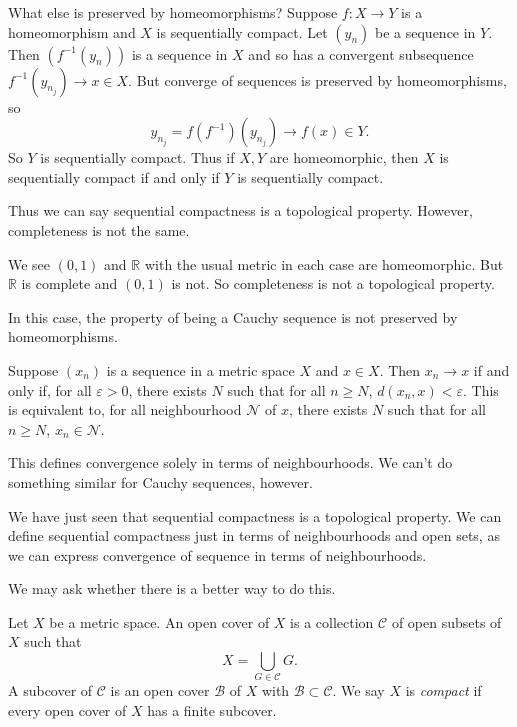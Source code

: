 \documentclass[12pt]{article}
\begin{document}
What else is preserved by homeomorphisms? Suppose $f : X \to Y$ is a homeomorphism and $X$ is sequentially compact. Let $(y_n)$ be a sequence in $Y$. Then $(f^{-1}(y_n))$ is a sequence in $X$ and so has a convergent subsequence $f^{-1}(y_{n_j}) \to x \in X$. But converge of sequences is preserved by homeomorphisms, so
\[
	y_{n_j} = f(f^{-1})(y_{n_j}) \to f(x) \in Y
.\]
So $Y$ is sequentially compact. Thus if $X, Y$ are homeomorphic, then $X$ is sequentially compact if and only if $Y$ is sequentially compact.

Thus we can say sequential compactness is a topological property. However, completeness is not the same.

\begin{exbox}
	We see $(0, 1)$ and $\mathbb{R}$ with the usual metric in each case are homeomorphic. But $\mathbb{R}$ is complete and $(0, 1)$ is not. So completeness is not a topological property.
\end{exbox}

In this case, the property of being a Cauchy sequence is not preserved by homeomorphisms.

\begin{remark}
	Suppose $(x_n)$ is a sequence in a metric space $X$ and $x \in X$. Then $x_n \to x$ if and only if, for all $\varepsilon > 0$, there exists $N$ such that for all $n \geq N$, $d(x_n, x) < \varepsilon$. This is equivalent to, for all neighbourhood $\mathcal{N}$ of $x$, there exists $N$ such that for all $n \geq N$, $x_n \in \mathcal{N}$.

	This defines convergence solely in terms of neighbourhoods. We can't do something similar for Cauchy sequences, however.
\end{remark}

We have just seen that sequential compactness is a topological property. We can define sequential compactness just in terms of neighbourhoods and open sets, as we can express convergence of sequence in terms of neighbourhoods.

We may ask whether there is a better way to do this.

\begin{definition}
	Let $X$ be a metric space. An open cover of $X$ is a collection $\mathcal{C}$ of open subsets of $X$ such that
	\[
	X = \bigcup_{G \in \mathcal{C}}G
	.\]
	A subcover of $\mathcal{C}$ is an open cover $\mathcal{B}$ of $X$ with $\mathcal{B} \subset \mathcal{C}$. We say $X$ is \textit{compact} if every open cover of $X$ has a finite subcover.
\end{definition}
\end{document}
